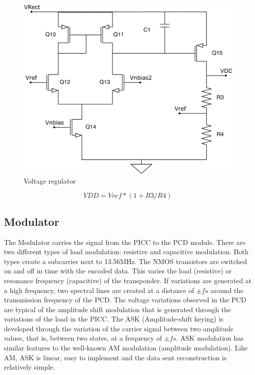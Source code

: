 \documentclass{article} %
\begin{document}
\begin{multicols}{2}
\begin{figure}[H]
\centering
\includegraphics[width=0.8\linewidth]{Images/ImagenesTesina/circuitos/LDO.png}
\caption{Voltage regulator}
\label{fig:ldo}
\end{figure}

\begin{equation} \label{eq:vref}
VDD = Vref*(1+R3/R4)
\end{equation}

\subsection{Modulator}
The Modulator carries the signal from the PICC to the PCD module. There are two different types of load modulation: resistive and capacitive modulation. Both types create a subcarrier next to 13.56MHz. The NMOS transistors are switched on and off in time with the encoded data. This varies the load (resistive) or resonance frequency (capacitive) of the transponder. 
If variations are generated at a high frequency, two spectral lines are created at a distance of $\pm \textit{fs}$ around the transmission frequency of the PCD. The voltage variations observed in the PCD are typical of the amplitude shift modulation that is generated through the variations of the load in the PICC. The ASK (Amplitude-shift keying) is developed through the variation of the carrier signal between two amplitude values, that is, between two states, at a frequency of $\pm \textit{fs}$. ASK modulation has similar features to the well-known AM modulation (amplitude modulation). Like AM, ASK is linear, easy to implement and the data sent reconstruction is relatively simple.



\end{multicols}
\end{document}
